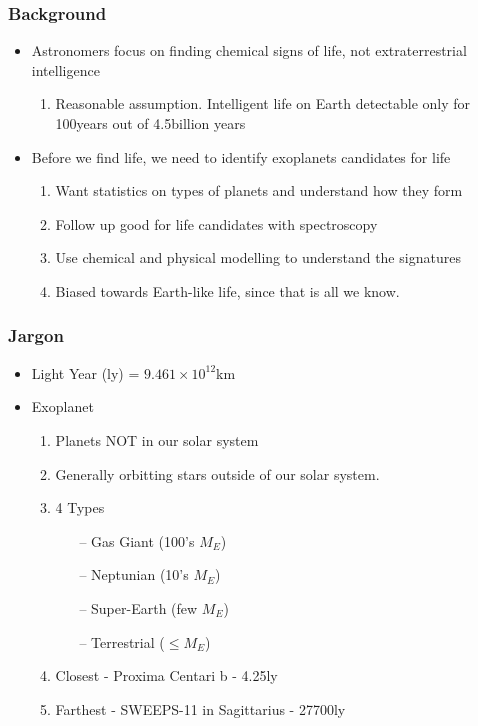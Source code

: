 \documentclass{beamer}
\begin{document}
\begin{frame}
\frametitle{Background}
\begin{itemize}
    \item Astronomers focus on finding chemical signs of life, not extraterrestrial intelligence
    \pause
    \begin{enumerate}
        \item Reasonable assumption. Intelligent life on Earth detectable only for
              100years out of 4.5billion years
    \end{enumerate}
    \item Before we find life, we need to identify exoplanets candidates for life
    \pause
    \begin{enumerate}
        \item Want statistics on types of planets and understand how they form
        \pause
        \item Follow up good for life candidates with spectroscopy 
        \pause
        \item Use chemical and physical modelling to understand the signatures
        \pause
        \item Biased towards Earth-like life, since that is all we know.
    \end{enumerate}
\end{itemize}
\end{frame}


\begin{frame}
\frametitle{Jargon}
\begin{itemize}
    \item Light Year (ly) = $9.461\times 10^{12}$km
    \pause
    \item Exoplanet
    \pause
    \begin{enumerate}
        \item Planets NOT in our solar system
        \pause 
        \item Generally orbitting stars outside of our solar system.
        \pause
        \item 4 Types
        \pause
        \begin{itemize}
            \item[--] Gas Giant (100's $M_{E}$)
            \pause
            \item[--] Neptunian (10's $M_{E}$)
            \pause
            \item[--] Super-Earth (few $M_{E}$)
            \pause
            \item[--] Terrestrial ($\leq M_{E}$)
        \end{itemize}
        \pause
        \item Closest - Proxima Centari b - 4.25ly
        \pause
        \item Farthest - SWEEPS-11 in Sagittarius - 27700ly
    \end{enumerate}
\end{itemize}
\end{frame}
\end{document}
